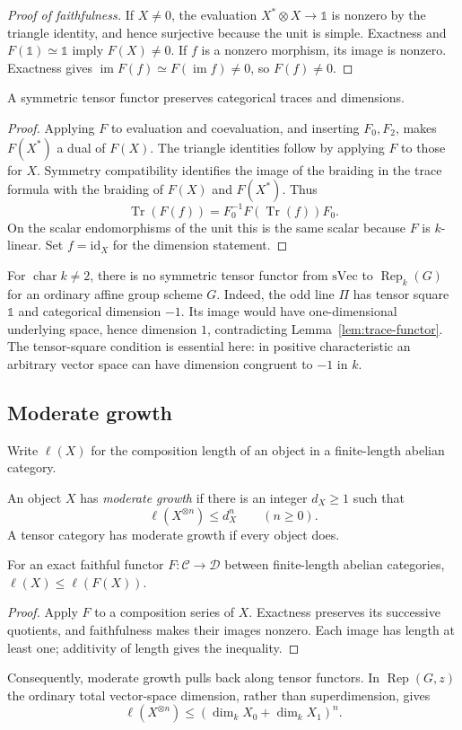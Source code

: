 \begin{proof}[Proof of faithfulness]
If $X\ne0$, the evaluation $X^*\otimes X\to\mathbb{1}$ is nonzero by the triangle identity, and hence surjective because the unit is simple. Exactness and $F(\mathbb{1})\simeq\mathbb{1}$ imply $F(X)\ne0$. If $f$ is a nonzero morphism, its image is nonzero. Exactness gives $\operatorname{im}F(f)\simeq F(\operatorname{im}f)\ne0$, so $F(f)\ne0$.
\end{proof}

\begin{lemma}\label{lem:trace-functor}
A symmetric tensor functor preserves categorical traces and dimensions.
\end{lemma}
\begin{proof}
Applying $F$ to evaluation and coevaluation, and inserting $F_0,F_2$, makes $F(X^*)$ a dual of $F(X)$. The triangle identities follow by applying $F$ to those for $X$. Symmetry compatibility identifies the image of the braiding in the trace formula with the braiding of $F(X)$ and $F(X^*)$. Thus
\[
 \operatorname{Tr}(F(f))=F_0^{-1}F(\operatorname{Tr}(f))F_0.
\]
On the scalar endomorphisms of the unit this is the same scalar because $F$ is $k$-linear. Set $f=\mathrm{id}_X$ for the dimension statement.
\end{proof}

For $\operatorname{char}k\ne2$, there is no symmetric tensor functor from $\mathrm{sVec}$ to $\operatorname{Rep}_k(G)$ for an ordinary affine group scheme $G$. Indeed, the odd line $\Pi$ has tensor square $\mathbb{1}$ and categorical dimension $-1$. Its image would have one-dimensional underlying space, hence dimension $1$, contradicting Lemma~\ref{lem:trace-functor}. The tensor-square condition is essential here: in positive characteristic an arbitrary vector space can have dimension congruent to $-1$ in $k$.

\subsection*{Moderate growth}
Write $\ell(X)$ for the composition length of an object in a finite-length abelian category.
\begin{definition}
An object $X$ has \emph{moderate growth} if there is an integer $d_X\geq1$ such that
\[
 \ell(X^{\otimes n})\leq d_X^n\qquad(n\geq0).
\]
A tensor category has moderate growth if every object does.
\end{definition}

\begin{lemma}
For an exact faithful functor $F:\mathcal C\to\mathcal D$ between finite-length abelian categories, $\ell(X)\leq\ell(F(X))$.
\end{lemma}
\begin{proof}
Apply $F$ to a composition series of $X$. Exactness preserves its successive quotients, and faithfulness makes their images nonzero. Each image has length at least one; additivity of length gives the inequality.
\end{proof}
Consequently, moderate growth pulls back along tensor functors. In $\operatorname{Rep}(G,z)$ the ordinary total vector-space dimension, rather than superdimension, gives
\[
 \ell(X^{\otimes n})\leq(\dim_kX_0+\dim_kX_1)^n.
\]

